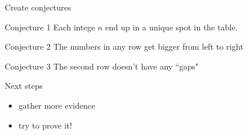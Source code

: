 \documentclass{beamer}
\begin{document}
\begin{frame}{Create conjectures}
  \begin{block}{Conjecture 1}
    Each intege $n$ end up in a unique spot in the table.
  \end{block}
\pause
  \begin{block}{Conjecture 2}
    The numbers in any row get bigger from left to right
  \end{block}
\pause
  \begin{block}{Conjecture 3}
    The second row doesn't have any ``gaps"
  \end{block}
\pause
  \begin{block}{Next steps}
    \begin{itemize}
\pause
      \item gather more evidence
\pause
      \item try to prove it!
    \end{itemize}
  \end{block}
\end{frame}
\end{document}
